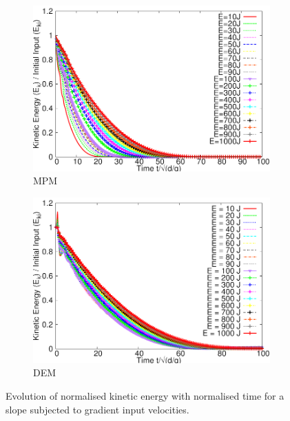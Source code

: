 \documentclass[3p,times,procedia,number]{elsarticle}
\begin{document}
\begin{figure}[tbhp]
  \centering
  \begin{subfigure}[b]{0.4\textwidth}
    \centering
    \includegraphics[width=\textwidth]{figs/Normalised_Energy_Time_Slope_MPM}
    \caption{MPM}
    \label{fig:Normalised_Energy_Time_Slope_MPM}
  \end{subfigure}
  \begin{subfigure}[b]{0.4\textwidth}
    \centering
    \includegraphics[width=\textwidth]{figs/Normalised_Energy_Time_Slope_DEM}
    \caption{DEM}
    \label{fig:Normalised_Energy_Time_Slope_DEM}
  \end{subfigure}
  \caption{Evolution of normalised kinetic energy with normalised time for a
  slope subjected to gradient input velocities.}
  \label{fig:Energy_Time_Slope}
\end{figure}
\end{document}

